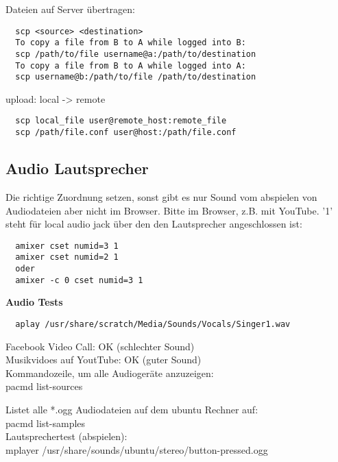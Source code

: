 Dateien auf Server übertragen:
\begin{verbatim}
  scp <source> <destination>
  To copy a file from B to A while logged into B:
  scp /path/to/file username@a:/path/to/destination
  To copy a file from B to A while logged into A:
  scp username@b:/path/to/file /path/to/destination
\end{verbatim}
upload: local -> remote
\begin{verbatim}
  scp local_file user@remote_host:remote_file
  scp /path/file.conf user@host:/path/file.conf
\end{verbatim}


\subsection{Audio Lautsprecher}

Die richtige Zuordnung setzen, sonst gibt es nur Sound vom 
abspielen von Audiodateien aber nicht im Browser. Bitte im 
Browser, z.B. mit YouTube. '1' steht für local audio jack über 
den den Lautsprecher angeschlossen ist:
\begin{verbatim}
  amixer cset numid=3 1
  amixer cset numid=2 1
  oder
  amixer -c 0 cset numid=3 1
\end{verbatim}

\textbf{Audio Tests}
\begin{verbatim}
  aplay /usr/share/scratch/Media/Sounds/Vocals/Singer1.wav
\end{verbatim}
Facebook Video Call: OK (schlechter Sound)\\
Musikvidoes auf YoutTube: OK (guter Sound)\\

Kommandozeile, um alle Audiogeräte anzuzeigen:\\
pacmd list-sources

Listet alle *.ogg Audiodateien auf dem ubuntu Rechner auf:\\
pacmd list-samples\\
Lautsprechertest (abspielen):\\
mplayer /usr/share/sounds/ubuntu/stereo/button-pressed.ogg 

